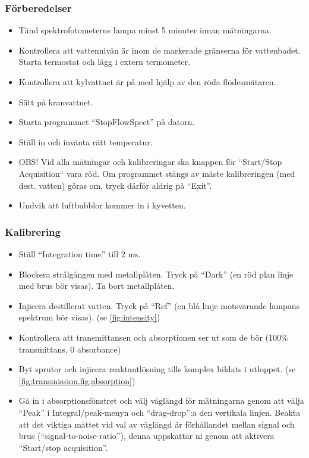 \subsubsection{Förberedelser}
\begin{itemize}
\item Tänd spektrofotometerns lampa minst 5 minuter innan mätningarna.
\item Kontrollera att vattennivån är inom de markerade gränserna för vattenbadet.
Starta termostat och lägg i extern termometer.
\item Kontrollera att kylvattnet är på med hjälp av den röda flödesmätaren.
\item Sätt på kranvattnet.
\item Starta programmet ``StopFlowSpect'' på datorn.
\item Ställ in och invänta rätt temperatur.
\item OBS! Vid alla mätningar och
  kalibreringar ska knappen för ``Start/Stop Acquisition`` vara röd. Om
  programmet stängs av måste kalibreringen (med dest. vatten) göras om,
  tryck därför aldrig på ``Exit''.
\item Undvik att luftbubblor kommer in i kyvetten.
\end{itemize}
\subsubsection{Kalibrering}
\begin{itemize}
\item Ställ ``Integration time'' till 2 ms.
\item Blockera strålgången med metallplåten. Tryck på ``Dark'' (en röd
  plan linje med brus bör visas). Ta bort
  metallplåten.
\item Injicera destillerat vatten. Tryck på ``Ref'' (en blå linje
  motsvarande lampans spektrum bör visas). (se \cref{fig:intensity})
\item Kontrollera att transmittansen och absorptionen ser ut som de
  bör (100\% transmittans, 0 absorbance)
\item Byt sprutor och injicera reaktantlösning tills komplex bildats i
  utloppet. (se \cref{fig:transmission,fig:absorption})
\item Gå in i absorptionsfönstret och välj våglängd
  för mätningarna genom att välja ``Peak'' i Integral/peak-menyn
  och ``drag-drop'':a den vertikala linjen. Beakta att det
  viktiga måttet vid val av våglängd är förhållandet mellan signal och brus
  (``signal-to-noise-ratio''), denna uppskattar ni genom att aktivera
  ``Start/stop acquisition''.
\end{itemize}

